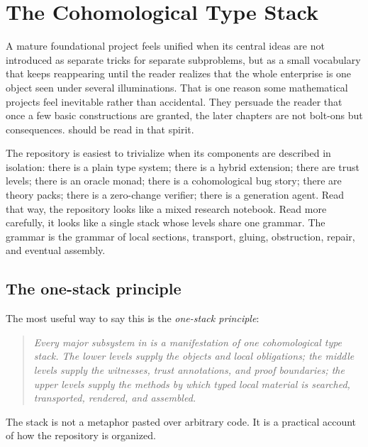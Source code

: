 \chapter{The Cohomological Type Stack}

A mature foundational project feels unified when its central ideas are not introduced as
separate tricks for separate subproblems, but as a small vocabulary that keeps reappearing
until the reader realizes that the whole enterprise is one object seen under several
illuminations. That is one reason some mathematical projects feel inevitable rather than
accidental. They persuade the reader that once a few basic constructions are granted, the
later chapters are not bolt-ons but consequences. \DepPy{} should be read in that spirit.

The repository is easiest to trivialize when its components are described in isolation:
there is a plain type system; there is a hybrid extension; there are trust levels; there is
an oracle monad; there is a cohomological bug story; there are theory packs; there is a
zero-change verifier; there is a generation agent. Read that way, the repository looks like
a mixed research notebook. Read more carefully, it looks like a single stack whose levels
share one grammar. The grammar is the grammar of local sections, transport, gluing,
obstruction, repair, and eventual assembly.

\section*{The one-stack principle}
The most useful way to say this is the \emph{one-stack principle}:
\begin{quote}
\emph{Every major subsystem in \DepPy{} is a manifestation of one cohomological type stack.
The lower levels supply the objects and local obligations; the middle levels supply the
witnesses, trust annotations, and proof boundaries; the upper levels supply the methods by
which typed local material is searched, transported, rendered, and assembled.}
\end{quote}

The stack is not a metaphor pasted over arbitrary code. It is a practical account of how
the repository is organized.

